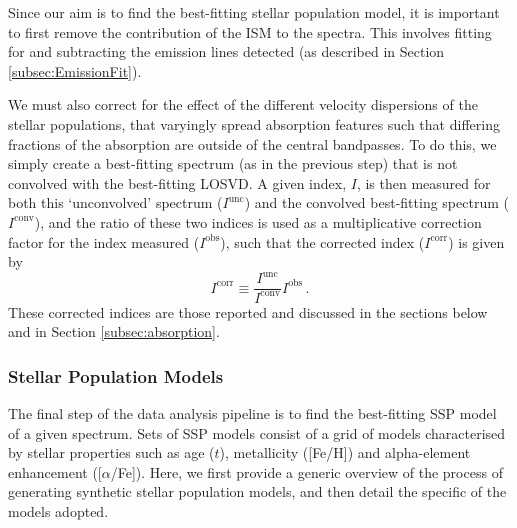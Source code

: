 			Since our aim is to find the best-fitting stellar population model, it is important to first remove the contribution of the ISM to the spectra. This involves fitting for and subtracting the emission lines detected (as described in Section \ref{subsec:EmissionFit}). 

			We must also correct for the effect of the different velocity dispersions of the stellar populations, that varyingly spread absorption features such that differing fractions of the absorption are outside of the central bandpasses. To do this, we simply create a best-fitting spectrum (as in the previous step) that is not convolved with the best-fitting LOSVD. A given index, $I$, is then measured for both this `unconvolved' spectrum ($I^\text{unc}$) and the convolved best-fitting spectrum ($I^\text{conv}$), and the ratio of these two indices is used as a multiplicative correction factor for the index measured ($I^\text{obs}$), such that the corrected index ($I^\text{corr}$) is given by
			\begin{equation}
				I^\text{corr} \equiv \frac{I^\text{unc}}{I^\text{conv}} I^\text{obs} \, .
			\end{equation}
			These corrected indices are those reported and discussed in the sections below and in Section \ref{subsec:absorption}.


		\subsubsection{Stellar Population Models}
			\label{subsubsec:StellarPop}
			The final step of the data analysis pipeline is to find the best-fitting SSP model of a given spectrum. Sets of SSP models consist of a grid of models characterised by stellar properties such as age ($t$), metallicity ([Fe/H]) and alpha-element enhancement ([$\alpha$/Fe]). Here, we first provide a generic overview of the process of generating synthetic stellar population models, and then detail the specific of the models adopted. 

